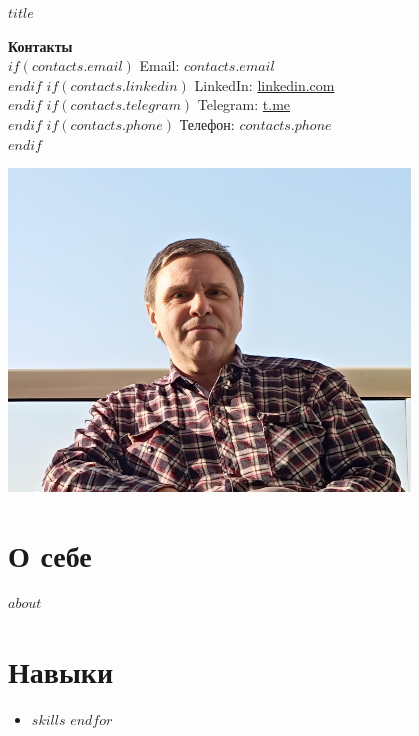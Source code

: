 \documentclass[a4paper,10pt]{article}
\begin{document}
\begin{center}
    \textbf{\huge $title$}
\end{center}
\vspace{0.5cm}
\begin{minipage}[t]{0.6\textwidth}
    \vspace*{0pt}
    \textbf{Контакты} \\
    $if(contacts.email)$ Email: \href{mailto:$contacts.email$}{$contacts.email$} \\ $endif$
    $if(contacts.linkedin)$ LinkedIn: \href{$contacts.linkedin$}{linkedin.com} \\ $endif$
    $if(contacts.telegram)$ Telegram: \href{$contacts.telegram$}{t.me} \\ $endif$
    $if(contacts.phone)$ Телефон: $contacts.phone$ \\ $endif$
\end{minipage}
\begin{minipage}[t]{0.4\textwidth}
    \vspace*{0pt}
    \raggedleft
    \includegraphics[width=0.8\textwidth,keepaspectratio]{static/img/avatar02.png}
\end{minipage}
\vspace{0.5cm}
\section*{О себе}
$about$
\vspace{0.5cm}
\section*{Навыки}
\begin{itemize}
$for(skills)$
    \item $skills$
$endfor$
\end{itemize}
\vspace{0.5cm}
\end{document}
